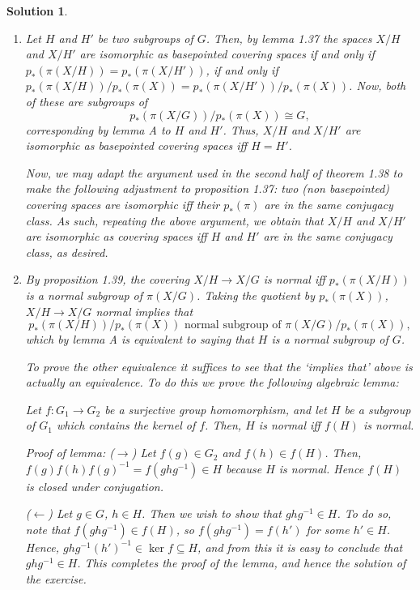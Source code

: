 \documentclass{article}
\theoremstyle{plain}
\theoremstyle{nonumberplain}
\newtheorem{sol}{Solution}
\begin{document}
\begin{sol}
\begin{enumerate}
\item Let $H$ and $H'$ be two subgroups of $G$. Then, by lemma 1.37 the spaces $X/H$ and $X/H'$ are isomorphic as basepointed covering spaces if and only if $p_*(\pi(X/H)) = p_*(\pi(X/H'))$, if and only if $p_*(\pi(X/H))/p_*(\pi(X)) = p_*(\pi(X/H'))/p_*(\pi(X))$. Now, both of these are subgroups of
\begin{equation}
p_*(\pi(X/G))/p_*(\pi(X)) \cong G,
\end{equation}
corresponding by lemma A to $H$ and $H'$. Thus, $X/H$ and $X/H'$ are isomorphic as \emph{basepointed} covering spaces iff $H = H'$.

Now, we may adapt the argument used in the second half of theorem 1.38 to make the following adjustment to proposition 1.37: two (non basepointed) covering spaces are isomorphic iff their $p_*(\pi)$ are in the same conjugacy class. As such, repeating the above argument, we obtain that $X/H$ and $X/H'$ are isomorphic as covering spaces iff $H$ and $H'$ are in the same conjugacy class, as desired.

\item By proposition 1.39, the covering $X/H \to X/G$ is normal iff $p_*(\pi(X/H))$ is a normal subgroup of $\pi(X/G)$. Taking the quotient by $p_*(\pi(X))$, $X/H \to X/G$ normal implies that
\begin{equation}
p_*(\pi(X/H))/p_*(\pi(X)) \text{ normal subgroup of } \pi(X/G)/p_*(\pi(X)),
\end{equation}
which by lemma A is equivalent to saying that $H$ is a normal subgroup of $G$.

To prove the other equivalence it suffices to see that the `implies that' above is actually an equivalence. To do this we prove the following algebraic lemma:

Let $f \colon G_1 \to G_2$ be a surjective group homomorphism, and let $H$ be a subgroup of $G_1$ which contains the kernel of $f$. Then, $H$ is normal iff $f(H)$ is normal.

Proof of lemma: ($\rightarrow$) Let $f(g) \in G_2$ and $f(h) \in f(H)$. Then, $f(g) f(h) f(g)^{-1} = f(g h g^{-1}) \in H$ because $H$ is normal. Hence $f(H)$ is closed under conjugation.

($\leftarrow$) Let $g \in G$, $h \in H$. Then we wish to show that $g h g^{-1} \in H$. To do so, note that $f(g h g^{-1}) \in f(H)$, so $f(g h g^{-1}) = f(h')$ for some $h' \in H$. Hence, $g h g^{-1} (h')^{-1} \in \ker f \subseteq H$, and from this it is easy to conclude that $g h g^{-1} \in H$. This completes the proof of the lemma, and hence the solution of the exercise.
\end{enumerate}
\end{sol}
\end{document}
